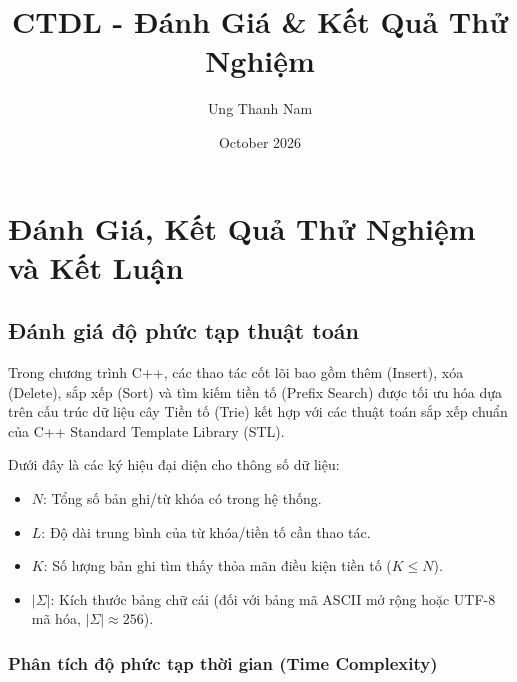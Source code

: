 \documentclass[12pt,a4paper]{report}
\title{CTDL - Đánh Giá \& Kết Quả Thử Nghiệm}
\author{Ung Thanh Nam}
\date{October 2026}
\begin{document}
\maketitle
\tableofcontents
\newpage


\newpage


\setcounter{chapter}{3}
\chapter{Đánh Giá, Kết Quả Thử Nghiệm và Kết Luận}
\label{chap:ket_qua_ket_luan}

\section{Đánh giá độ phức tạp thuật toán}
\label{sec:do_phuc_tap}

Trong chương trình C++, các thao tác cốt lõi bao gồm thêm (Insert), xóa (Delete), sắp xếp (Sort) và tìm kiếm tiền tố (Prefix Search) được tối ưu hóa dựa trên cấu trúc dữ liệu cây Tiền tố (Trie) kết hợp với các thuật toán sắp xếp chuẩn của C++ Standard Template Library (STL).

Dưới đây là các ký hiệu đại diện cho thông số dữ liệu:
\begin{itemize}
    \item $N$: Tổng số bản ghi/từ khóa có trong hệ thống.
    \item $L$: Độ dài trung bình của từ khóa/tiền tố cần thao tác.
    \item $K$: Số lượng bản ghi tìm thấy thỏa mãn điều kiện tiền tố ($K \le N$).
    \item $\vert{}\Sigma\vert{}$: Kích thước bảng chữ cái (đối với bảng mã ASCII mở rộng hoặc UTF-8 mã hóa, $\vert{}\Sigma\vert{} \approx 256$).
\end{itemize}

\subsection{Phân tích độ phức tạp thời gian (Time Complexity)}
\end{document}
